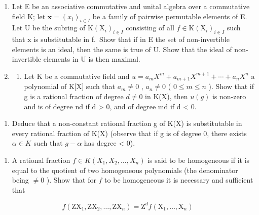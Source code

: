 \BourbakiExerciseGroup

\begin{enumerate}
\def\labelenumi{\arabic{enumi})}
\item
  Let E be an associative commutative and unital algebra over a commutative field K; let \(\mathbf{x} = (x_i)_{i \in I}\) be a family of pairwise permutable elements of E. Let U be the subring of \(\mathrm{K}(\mathrm{X}_i)_{i \in I}\) consisting of all \(f \in \mathrm{K}(\mathrm{X}_i)_{i \in I}\) such that x is substitutable in f.~Show that if in E the set of non-invertible elements is an ideal, then the same is true of U. Show that the ideal of non-invertible elements in U is then maximal.
\item
  \begin{enumerate}
  \def\labelenumii{\alph{enumii})}
  \tightlist
  \item
    Let K be a commutative field and \(u = a_{m}X^{m} + a_{m+1}X^{m+1} + \cdots + a_{n}X^{n}\) a polynomial of K{[}X{]} such that \(a_{m} \neq 0\) , \(a_{n} \neq 0\) ( \(0 \leq m \leq n\) ). Show that if g is a rational fraction of degree \(d \neq 0\) in K(X), then \(u(g)\) is non-zero and is of degree nd if d \textgreater{} 0, and of degree md if d \textless{} 0.
  \end{enumerate}
\end{enumerate}

\begin{enumerate}
\def\labelenumi{\alph{enumi})}
\setcounter{enumi}{1}
\tightlist
\item
  Deduce that a non-constant rational fraction g of K(X) is substitutable in every rational fraction of K(X) (observe that if g is of degree 0, there exists \(\alpha \in K\) such that \(g - \alpha\) has degree \textless{} 0).
\end{enumerate}

\begin{enumerate}
\def\labelenumi{\arabic{enumi})}
\setcounter{enumi}{2}
\tightlist
\item
  A rational fraction \(f \in K(X_1, X_2, \ldots, X_n)\) is said to be homogeneous if it is equal to the quotient of two homogeneous polynomials (the denominator being \(\neq 0\) ). Show that for \(f\) to be homogeneous it is necessary and sufficient that
\end{enumerate}

\[
f \left(\mathrm{ZX} _ {1}, \mathrm{ZX} _ {2}, \dots , \mathrm{ZX} _ {n}\right) = \mathrm{Z} ^ {d} f \left(\mathrm{X} _ {1}, \dots , \mathrm{X} _ {n}\right)
\]

